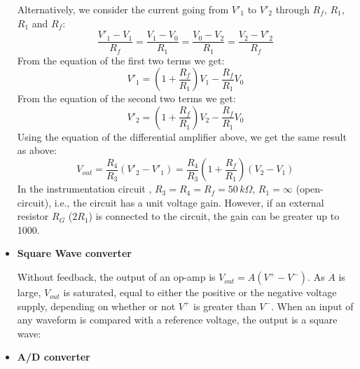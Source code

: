 \documentclass{article}
\begin{document}
\begin{itemize}
  Alternatively, we consider the current going from $V'_1$ to $V'_2$
  through $R_f$, $R_1$, $R_1$ and $R_f$:
  \begin{equation}
  \frac{V'_1-V_1}{R_f}=\frac{V_1-V_0}{R_1}=\frac{V_0-V_2}{R_1}
  =\frac{V_2-V'_2}{R_f} 
  \end{equation}
  From the equation of the first two terms we get:
  \begin{equation}
  V'_1=\left(1+\frac{R_f}{R_1}\right)V_1-\frac{R_f}{R_1}V_0 
  \end{equation}
  From the equation of the second two terms we get:
  \begin{equation}
  V'_2=\left(1+\frac{R_f}{R_1}\right)V_2-\frac{R_f}{R_1}V_0 
  \end{equation}
  Using the equation of the differential amplifier above, we get the
  same result as above:
  \begin{equation}
  V_{out}=\frac{R_4}{R_3}(V'_2-V'_1)
  =\frac{R_4}{R_3}\left(1+\frac{R_f}{R_1}\right)(V_2-V_1) 
  \end{equation}
  In the instrumentation circuit 
  ,
  $R_3=R_4=R_f=50\,k\Omega$, $R_1=\infty$ (open-circuit), i.e., the 
  circuit has a unit voltage gain. However, if an external resistor 
  $R_G$ ($2R_1$) is connected to the circuit, the gain can be greater 
  up to 1000.
  




\item {\bf Square Wave converter}

  Without feedback, the output of an op-amp is $V_{out}=A(V^+-V^-)$. As $A$ is
  large, $V_{out}$ is saturated, equal to either the positive or the negative
  voltage supply, depending on whether or not $V^+$ is greater than $V^-$. 
  When an input of any waveform is compared with a reference voltage, the
  output is a square wave:



\item {\bf A/D converter}


\end{itemize}
\end{document}
